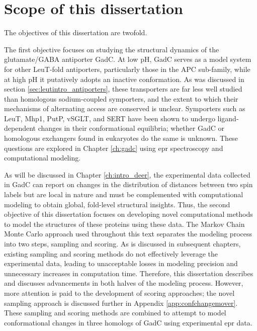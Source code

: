 \section{Scope of this dissertation}

The objectives of this dissertation are twofold.

The first objective focuses on studying the structural dynamics of the glutamate/GABA antiporter GadC. At low pH, GadC serves as a model system for other LeuT-fold antiporters, particularly those in the APC sub-family, while at high pH it putatively adopts an inactive conformation. As was discussed in section \ref{sec:leutintro_antiporters}, these transporters are far less well studied than homologous sodium-coupled symporters, and the extent to which their mechanisms of alternating access are conserved is unclear. Symporters such as LeuT, Mhp1, PutP, vSGLT, and SERT have been shown to undergo ligand-dependent changes in their conformational equilibria; whether GadC or homologous exchangers found in eukaryotes do the same is unknown. These questions are explored in Chapter \ref{ch:gadc} using \gls{epr} spectroscopy and computational modeling.

As will be discussed in Chapter \ref{ch:intro_deer}, the experimental data collected in GadC can report on changes in the distribution of distances between two spin labels but are local in nature and must be complemented with computational modeling to obtain global, fold-level structural insights. Thus, the second objective of this dissertation focuses on developing novel computational methods to model the structures of these proteins using these data. The Markov Chain Monte Carlo approach used throughout this text separates the modeling process into two steps, sampling and scoring. As is discussed in subsequent chapters, existing sampling and scoring methods do not effectively leverage the experimental data, leading to unacceptable losses in modeling precision and unnecessary increases in computation time. Therefore, this dissertation describes and discusses advancements in both halves of the modeling process. However, more attention is paid to the development of scoring approaches; the novel sampling approach is discussed further in Appendix \ref{app:confchangemover}. These sampling and scoring methods are combined to attempt to model conformational changes in three homologs of GadC using experimental \gls{epr} data.

